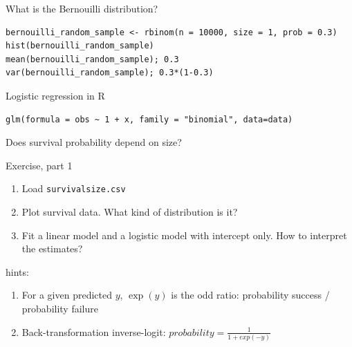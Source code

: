 \documentclass[10pt]{beamer}
\makeatletter
\newenvironment{kframe}{%
 \def\at@end@of@kframe{}%
 \ifinner\ifhmode%
  \def\at@end@of@kframe{\end{minipage}}%
  \begin{minipage}{\columnwidth}%
 \fi\fi%
 \def\FrameCommand##1{\hskip\@totalleftmargin \hskip-\fboxsep
 \colorbox{shadecolor}{##1}\hskip-\fboxsep
     \hskip-\linewidth \hskip-\@totalleftmargin \hskip\columnwidth}%
 \MakeFramed {\advance\hsize-\width
   \@totalleftmargin\z@ \linewidth\hsize
   \@setminipage}}%
 {\par\unskip\endMakeFramed%
 \at@end@of@kframe}
\newenvironment{knitrout}{}{} %
\makeatother
\begin{document}
\begin{frame}[fragile]{What is the Bernouilli distribution?}

    
\begin{knitrout}
\color{fgcolor}\begin{kframe}
\begin{verbatim}
bernouilli_random_sample <- rbinom(n = 10000, size = 1, prob = 0.3)
hist(bernouilli_random_sample)
mean(bernouilli_random_sample); 0.3
var(bernouilli_random_sample); 0.3*(1-0.3)
\end{verbatim}
\end{kframe}
\end{knitrout}

\end{frame}

  
\begin{frame}[fragile]{Logistic regression in R}

    
\begin{knitrout}
\color{fgcolor}\begin{kframe}
\begin{verbatim}
glm(formula = obs ~ 1 + x, family = "binomial", data=data)
\end{verbatim}
\end{kframe}
\end{knitrout}

\end{frame}

\begin{frame}{Does survival probability depend on size?}
 
  \begin{exampleblock}{Exercise, part 1}
    \begin{enumerate}
      \item Load \texttt{survivalsize.csv}
      \item Plot survival data. What kind of distribution is it?
      \item Fit a linear model and a logistic model with intercept only. How to interpret the estimates?
    \end{enumerate}
  \end{exampleblock}
  
  \pause
  
  \begin{block}{hints:}
  \begin{enumerate}
   \item For a given predicted $y$, $\exp(y)$ is the odd ratio: probability success / probability failure
   \item Back-transformation inverse-logit: $probability = \frac{1}{1 + exp(-y)}$
  \end{enumerate}
  \end{block}

  
\end{frame}
\end{document}
